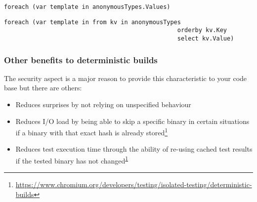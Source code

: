 \begin{lstlisting}[label={lst:undeterministic-values}]
foreach (var template in anonymousTypes.Values)
\end{lstlisting}

\begin{lstlisting}[label={lst:deterministic-values}]
foreach (var template in from kv in anonymousTypes 
												 orderby kv.Key 
												 select kv.Value)
\end{lstlisting}

\subsubsection{Other benefits to deterministic builds}
\label{sec:deterministic-builds-benefits}

The security aspect is a major reason to provide this characteristic to your code base but there are others:

\begin{itemize}
\item Reduces surprises by not relying on unspecified behaviour
\item Reduces I/O load by being able to skip a specific binary in certain situations if a binary with that exact hash is already stored\footnote{\label{ft:chromium}\url{https://www.chromium.org/developers/testing/isolated-testing/deterministic-builds}}
\item Reduces test execution time through the ability of re-using cached test results if the tested binary has not changed\textsuperscript{\ref{ft:chromium}}
\end{itemize}